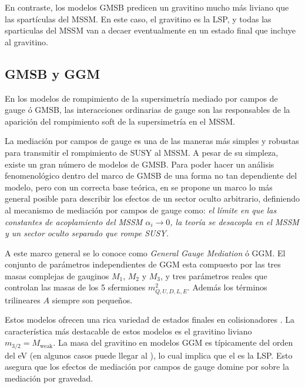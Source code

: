 En contraste, los modelos GMSB predicen un gravitino mucho más liviano que las
spartículas del MSSM.%
En este caso, el gravitino es
la LSP, y todas las sparticulas del MSSM van a decaer eventualmente en un estado
final que incluye al gravitino.


\subsection{GMSB y GGM} %

En los modelos de rompimiento de la supersimetría mediado por campos de gauge ó
GMSB, las interacciones ordinarias de gauge son las responsables de la aparición
del rompimiento soft de la supersimetría en el MSSM.


La mediación por campos de gauge es una de las maneras más simples y robustas
para transmitir el rompimiento de SUSY al MSSM. A pesar de su simpleza, existe
un gran número de modelos de GMSB. Para poder hacer un análisis fenomenológico
dentro del marco de GMSB de una forma no tan dependiente del modelo, pero con un
correcta base teórica, en \cite{GGM} se propone un marco lo más general posible
para describir los efectos de un sector oculto arbitrario, definiendo al
mecanismo de mediación por campos de gauge como: \emph{el límite en que las
  constantes de acoplamiento del MSSM $\alpha_i \to 0$, la teoría se desacopla
  en el MSSM y un sector oculto separado que rompe SUSY.}

A este marco general se lo conoce como \emph{General Gauge Mediation} ó GGM. El
conjunto de parámetros independientes de GGM esta compuesto por las tres masas
complejas de gauginos $M_1$, $M_2$ y $M_3$, y tres parámetros reales que
controlan las masas de los 5 sfermiones $m^2_{Q,U,D,L,E}$. Además los términos
trilineares $A$ siempre son pequeños.

Estos modelos ofrecen una rica variedad de estados finales en colisionadores
\cite{0911.4130}. La característica más destacable de estos modelos es el
gravitino liviano $m_{3/2} = M_\text{weak}$. La masa del gravitino en modelos
GGM es típicamente del orden del eV (en algunos casos puede llegar al \gev), lo
cual implica que el {\gravino} es la LSP. Esto asegura que los efectos de
mediación por campos de gauge domine por sobre la mediación por gravedad.

